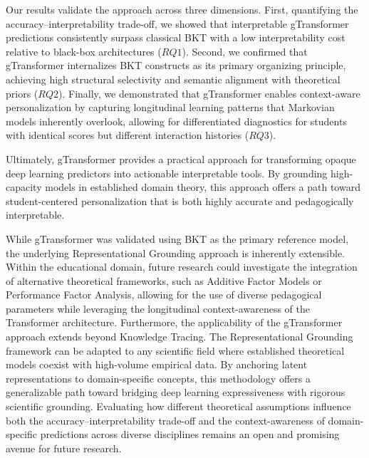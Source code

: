 \documentclass[applsci,article,submit,moreauthors,pdftex]{Definitions/mdpi}
\begin{document}
Our results validate the approach across three dimensions. First, quantifying the accuracy--interpretability trade-off, we showed that interpretable gTransformer predictions consistently surpass classical BKT with a low interpretability cost relative to black-box architectures ($RQ1$). Second, we confirmed that gTransformer internalizes BKT constructs as its primary organizing principle, achieving high structural selectivity and semantic alignment with theoretical priors ($RQ2$). Finally, we demonstrated that gTransformer enables context-aware personalization by capturing longitudinal learning patterns that Markovian models inherently overlook, allowing for differentiated diagnostics for students with identical scores but different interaction histories ($RQ3$).

Ultimately, gTransformer provides a practical approach for transforming opaque deep learning predictors into actionable interpretable tools. By grounding high-capacity models in established domain theory, this approach offers a path toward student-centered personalization that is both highly accurate and pedagogically interpretable.

While gTransformer was validated using BKT as the primary reference model, the underlying Representational Grounding approach is inherently extensible. Within the educational domain, future research could investigate the integration of alternative theoretical frameworks, such as Additive Factor Models or Performance Factor Analysis, allowing for the use of diverse pedagogical parameters while leveraging the longitudinal context-awareness of the Transformer architecture. Furthermore, the applicability of the gTransformer approach extends beyond Knowledge Tracing. The Representational Grounding framework can be adapted to any scientific field where established theoretical models coexist with high-volume empirical data. By anchoring latent representations to domain-specific concepts, this methodology offers a generalizable path toward bridging deep learning expressiveness with rigorous scientific grounding. Evaluating how different theoretical assumptions influence both the accuracy--interpretability trade-off and the context-awareness of domain-specific predictions across diverse disciplines remains an open and promising avenue for future research.


\vspace{6pt} 

\end{document}
